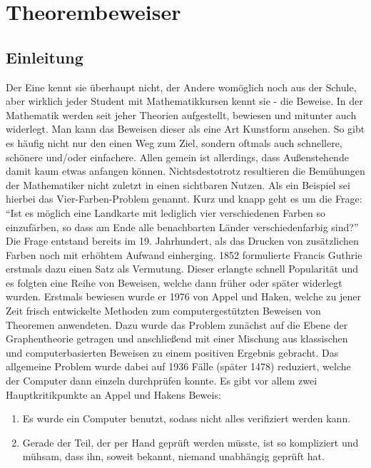 
\chapter{Theorembeweiser}
\section{Einleitung}
Der Eine kennt sie überhaupt nicht, der Andere womöglich noch aus der Schule, aber wirklich
jeder Student mit Mathematikkursen kennt sie - die Beweise.
In der Mathematik werden seit jeher Theorien aufgestellt, bewiesen und mitunter auch widerlegt.
Man kann das Beweisen dieser als eine Art Kunstform ansehen.
So gibt es häufig nicht nur den einen Weg zum Ziel, sondern oftmals auch schnellere, schönere und/oder einfachere.
Allen gemein ist allerdings, dass Außenstehende damit kaum etwas anfangen können. Nichtsdestotrotz resultieren die Bemühungen der Mathematiker nicht zuletzt in einen sichtbaren Nutzen.
Als ein Beispiel sei hierbei das Vier-Farben-Problem genannt. Kurz und knapp geht es um die Frage: \enquote{Ist es möglich eine Landkarte mit lediglich vier verschiedenen Farben so einzufärben, so dass am Ende alle benachbarten Länder verschiedenfarbig sind?}
Die Frage entstand bereits im 19. Jahrhundert, als das Drucken von zusätzlichen Farben noch mit erhöhtem Aufwand einherging. 1852 formulierte Francis Guthrie erstmals dazu einen Satz als Vermutung. Dieser erlangte schnell Popularität und es folgten eine Reihe von Beweisen, welche dann früher oder später widerlegt wurden. Erstmals bewiesen wurde er 1976 von Appel und Haken, welche zu jener Zeit frisch entwickelte Methoden zum computergestützten Beweisen von Theoremen anwendeten. Dazu wurde das Problem zunächst auf die Ebene der Graphentheorie getragen und anschließend mit einer Mischung aus klassischen und computerbasierten Beweisen zu einem positiven Ergebnis gebracht. Das allgemeine Problem wurde dabei auf 1936 Fälle (später 1478) reduziert, welche der Computer dann einzeln durchprüfen konnte. Es gibt vor allem zwei Hauptkritikpunkte an Appel und Hakens Beweis:
\begin{enumerate}
\item Es wurde ein Computer benutzt, sodass nicht alles verifiziert werden kann.
\item  Gerade der Teil, der per Hand geprüft werden müsste, ist so kompliziert und
mühsam, dass ihn, soweit bekannt, niemand unabhängig geprüft hat.
\end{enumerate}

